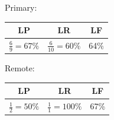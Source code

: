 \documentclass[t]{beamer}
\begin{document}
\begin{frame}
\begin{adjustbox}{frame,scale=.75,center}
\begin{tikzpicture}[level distance=15mm, sibling distance=15mm, ->,
	    every circle node/.append style={fill=black}]
	\end{tikzpicture}
\end{adjustbox}
\vfill
\begin{adjustbox}{scale=.75,center}
	Primary:
	\begin{tabular}{ccc}
		\textbf{LP} & \textbf{LR} & \textbf{LF} \\ \hline
		$\frac69=67\%$ & $\frac6{10}=60\%$ & 64\%
	\end{tabular}
	\hspace{1cm}
	Remote:
	\begin{tabular}{ccc}
		\textbf{LP} & \textbf{LR} & \textbf{LF} \\ \hline
		$\frac12=50\%$ & $\frac11=100\%$ & 67\%
	\end{tabular}
\end{adjustbox}
\end{frame}
\end{document}
